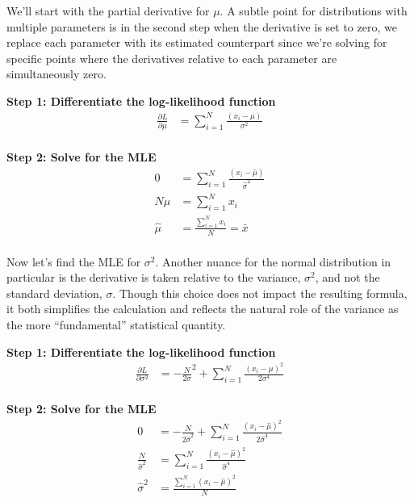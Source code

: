 We'll start with the partial derivative for $\mu$. A subtle point for distributions with multiple parameters is in the second step when the derivative is set to zero, we replace each parameter with its estimated counterpart since we're solving for specific points where the derivatives relative to each parameter are simultaneously zero.

\textbf{Step 1: Differentiate the log-likelihood function}
\begin{align*}
\frac{\partial L}{\partial \mu}
&= \sum_{i=1}^N \frac{\left( x_i- \mu \right)}{\sigma^2} \\
\end{align*}

\textbf{Step 2: Solve for the MLE}
\begin{align*}
0 &= \sum_{i=1}^N \frac{\left( x_i- \hat{\mu} \right)}{\hat{\sigma}^2} \\
N\hat{\mu} &= \sum_{i=1}^N x_i \\
\hat{\mu} &= \frac{\sum_{i=1}^N x_i}{N} = \bar{x} \\
\end{align*}

Now let's find the MLE for $\sigma^2$. Another nuance for the normal distribution in particular is the derivative is taken relative to the variance, $\sigma^2$, and not the standard deviation, $\sigma$. Though this choice does not impact the resulting formula, it both simplifies the calculation and reflects the natural role of the variance as the more ``fundamental'' statistical quantity.

\textbf{Step 1: Differentiate the log-likelihood function}
\begin{align*}
\frac{\partial L}{\partial \sigma^2}
&= -\frac{N}{2\sigma}^2 + \sum_{i=1}^N \frac{\left( x_i- \mu \right)^2}{2\sigma^4} \\
\end{align*}

\textbf{Step 2: Solve for the MLE}
\begin{align*}
0 &= -\frac{N}{2\hat{\sigma}^2} + \sum_{i=1}^N \frac{\left( x_i- \hat{\mu} \right)^2}{2\hat{\sigma}^4} \\
\frac{N}{\hat{\sigma}^2} &= \sum_{i=1}^N \frac{\left( x_i- \hat{\mu} \right)^2}{\hat{\sigma}^4} \\
{\hat{\sigma}^2} &= \frac{\sum_{i=1}^N \left( x_i- \hat{\mu} \right)^2}{N} \\
\end{align*}

